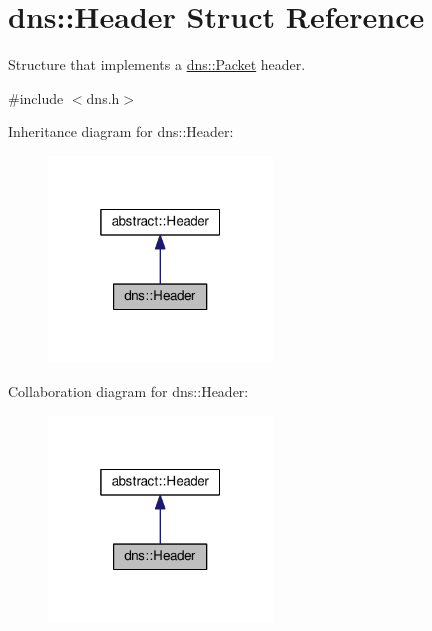 \hypertarget{structdns_1_1Header}{}\section{dns\+:\+:Header Struct Reference}
\label{structdns_1_1Header}


Structure that implements a \hyperlink{structdns_1_1Packet}{dns\+::\+Packet} header.  




{\ttfamily \#include $<$dns.\+h$>$}



Inheritance diagram for dns\+:\+:Header\+:\nopagebreak
\begin{figure}[H]
\begin{center}
\leavevmode
\includegraphics[width=169pt]{structdns_1_1Header__inherit__graph}
\end{center}
\end{figure}


Collaboration diagram for dns\+:\+:Header\+:\nopagebreak
\begin{figure}[H]
\begin{center}
\leavevmode
\includegraphics[width=169pt]{structdns_1_1Header__coll__graph}
\end{center}
\end{figure}
